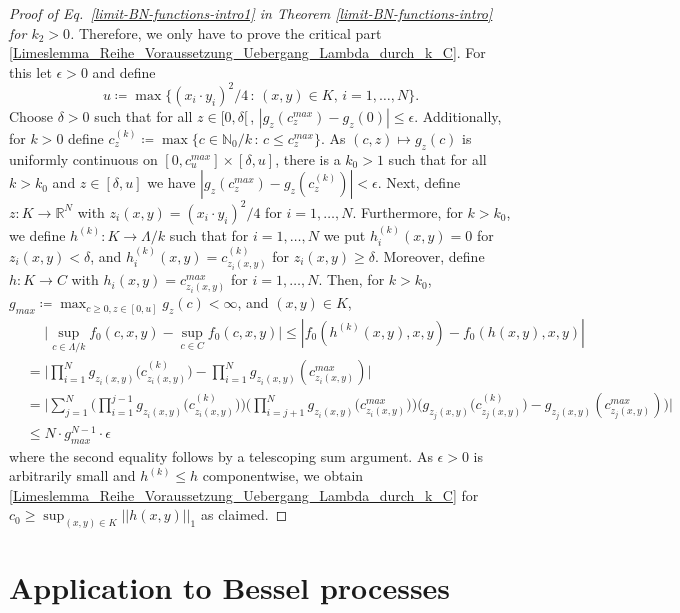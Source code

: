 \documentclass[reqno]{amsart}
\theoremstyle{plain}
\theoremstyle{definition}
\numberwithin{equation}{section}
\newcommand{\R}{\mathbb{R}}
\newcommand{\N}{\mathbb{N}}
\newcommand{\ra}{\rightarrow}
\begin{document}
\begin{proof}[Proof of Eq.~\eqref{limit-BN-functions-intro1} in Theorem \ref{limit-BN-functions-intro} for $k_2>0$]
Therefore, we only have to prove the critical part \eqref{Limeslemma_Reihe_Voraussetzung_Uebergang_Lambda_durch_k_C}.
For this  let $\epsilon>0$ and define
$$u \coloneqq \max\{(x_i \cdot y_i)^2/4 \, : \, (x,y) \in K, \, i=1,\ldots,N\}.$$
Choose $\delta>0$ such that for all $z \in [0,\delta[\,$, $|g_z(c^{max}_z) - g_z(0)| \leq \epsilon$.
Additionally,  for $k>0$ define $c^{(k)}_z \coloneqq \max\{c \in \N_0/k \, : \, c \leq c^{max}_z\}$.
As  $(c,z) \mapsto g_z(c)$ is uniformly continuous on $[0,c^{max}_u] \times [\delta,u]$, there is a $k_0 > 1$ such that for all $k > k_0$ and $z \in [\delta,u]$ we have 
$|g_z(c^{max}_z) - g_z(c^{(k)}_z)|<\epsilon$. 
Next, define $z:K \ra \R^N$ with $z_i(x,y)=(x_i \cdot y_i)^2/4$ for $i=1, \ldots, N$.
Furthermore, for $k>k_0$, we define  $h^{(k)} : K \to \Lambda/k$ such that for $i=1,\ldots,N$
we put $h^{(k)}_i(x,y)=0$ for  $z_i(x,y) < \delta$,
and $h^{(k)}_i(x,y)=c^{(k)}_{z_i(x,y)}$ for  $z_i(x,y) \geq \delta$. 
Moreover, define $h : K \ra C$ with $h_i(x,y)=c^{max}_{z_i(x,y)}$ for $i=1,\ldots,N$.
Then, for $k>k_0$, $g_{max} \coloneqq \max_{c \geq 0, z \in [0,u]} g_z(c) < \infty$, and $(x,y) \in K$,
\begin{align*}
&\>\>\>\>\>\>\Bigg| \sup\limits_{c \in \Lambda/k} f_0(c,x,y) - \sup\limits_{c \in C} f_0(c,x,y) \Bigg|
\leq |f_0(h^{(k)}(x,y),x,y)-f_0(h(x,y),x,y)| \\
&= \Bigg| \prod\limits_{i=1}^N g_{z_i(x,y)}\Big(c^{(k)}_{z_i(x,y)}\Big) - \prod\limits_{i=1}^N g_{z_i(x,y)}(c^{max}_{z_i(x,y)}) \Bigg| \\
&=\Bigg| \sum\limits_{j=1}^{N} \Bigg( \prod\limits_{i=1}^{j-1} g_{z_i(x,y)}\Big(c^{(k)}_{z_i(x,y)}\Big) \Bigg)
\Bigg( \prod\limits_{i=j+1}^N g_{z_i(x,y)}\Big(c^{max}_{z_i(x,y)}\Big) \Bigg)
\Big( g_{z_j(x,y)}\Big(c^{(k)}_{z_j(x,y)}\Big) - g_{z_j(x,y)}(c^{max}_{z_j(x,y)}) \Big) \Bigg|   \\
&\leq N \cdot g_{max}^{N-1} \cdot \epsilon
\end{align*}
where the second equality follows by a telescoping sum argument.
As $\epsilon>0$ is  arbitrarily small and $h^{(k)} \leq h$ componentwise, we obtain
\eqref{Limeslemma_Reihe_Voraussetzung_Uebergang_Lambda_durch_k_C} 
for $c_0 \geq \sup_{(x,y) \in K}||h(x,y)||_1$ as claimed.
\end{proof}


\section{Application to Bessel processes}
\end{document}
